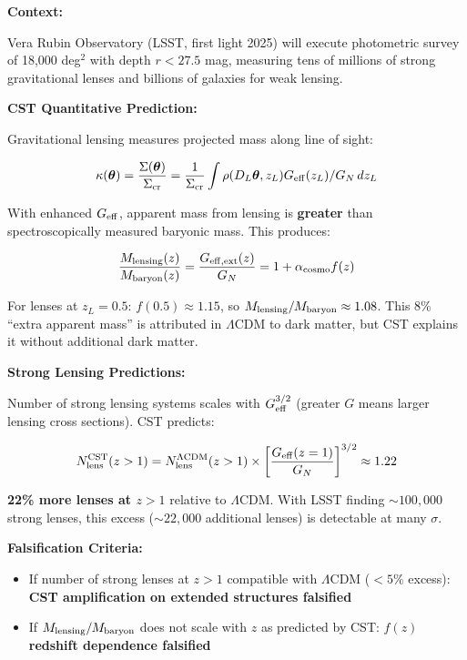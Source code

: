 \documentclass[10pt,a4paper]{article}
\providecommand{\tightlist}{\setlength{\itemsep}{0pt}\setlength{\parskip}{0pt}}
\begin{document}
\textbf{Context:}

Vera Rubin Observatory (LSST, first light 2025) will execute photometric
survey of 18,000 deg$^{2}$ with depth \(r < 27.5\) mag, measuring tens of
millions of strong gravitational lenses and billions of galaxies for
weak lensing.

\textbf{CST Quantitative Prediction:}

Gravitational lensing measures projected mass along line of sight:

\[\kappa(\boldsymbol\theta) = \frac{\Sigma(\boldsymbol\theta)}{\Sigma_{\rm cr}} = \frac{1}{\Sigma_{\rm cr}} \int \rho(D_L \boldsymbol\theta, z_L) G_{\rm eff}(z_L)/G_N \, dz_L\]

With enhanced \(G_{\rm eff}\), apparent mass from lensing is
\textbf{greater} than spectroscopically measured baryonic mass. This
produces:

\[\frac{M_{\rm lensing}(z)}{M_{\rm baryon}(z)} = \frac{G_{\rm eff,ext}(z)}{G_N} = 1 + \alpha_{\rm cosmo} f(z)\]

For lenses at \(z_L = 0.5\): \(f(0.5) \approx 1.15\), so
\(M_{\rm lensing}/M_{\rm baryon} \approx 1.08\). This 8\% ``extra
apparent mass'' is attributed in \(\Lambda\)CDM to dark matter, but CST
explains it without additional dark matter.

\textbf{Strong Lensing Predictions:}

Number of strong lensing systems scales with \(G_{\rm eff}^{3/2}\)
(greater \(G\) means larger lensing cross sections). CST predicts:

\[N_{\rm lens}^{\rm CST}(z > 1) = N_{\rm lens}^{\Lambda{\rm CDM}}(z > 1) \times \left[\frac{G_{\rm eff}(z=1)}{G_N}\right]^{3/2} \approx 1.22\]

\textbf{22\% more lenses at \(z > 1\)} relative to \(\Lambda\)CDM. With
LSST finding \(\sim 100,000\) strong lenses, this excess
(\(\sim 22,000\) additional lenses) is detectable at many \(\sigma\).

\textbf{Falsification Criteria:}

\begin{itemize}
\tightlist
\item
  If number of strong lenses at \(z > 1\) compatible with \(\Lambda\)CDM
  (\(< 5\%\) excess): \textbf{CST amplification on extended structures
  falsified}
\item
  If \(M_{\rm lensing}/M_{\rm baryon}\) does not scale with \(z\) as
  predicted by CST: \textbf{\(f(z)\) redshift dependence falsified}
\end{itemize}
\end{document}
